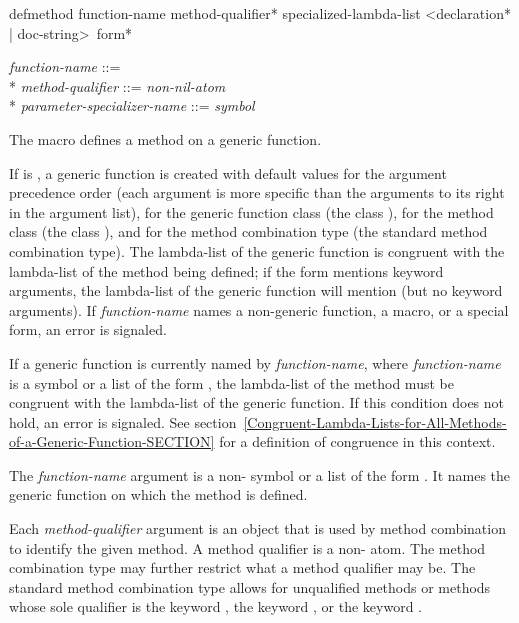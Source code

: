\begin{defmac}
defmethod function-name {method-qualifier}*
          specialized-lambda-list
          <{declaration}* | doc-string> {\,form}*

\begin{tabbing}
{\it function-name\/} ::=  \\*
{\it method-qualifier\/} ::= {\it non-nil-atom} \\*
{\it parameter-specializer-name\/} ::= {\it symbol} {\Mor} 
\end{tabbing}
The macro  defines a method on a generic function.  

If  is , a generic
function is created with default values for the argument precedence
order (each argument is more specific than the arguments to its right
in the argument list), for the generic function class (the class 
), for the method class (the class 
), and for the method combination type (the standard
method combination type).  The lambda-list of the generic function is
congruent with the lambda-list of the method being defined; if the
 form mentions keyword arguments, the lambda-list of
the generic function will mention  (but no keyword
arguments).  If {\it function-name\/} names a non-generic
function, a macro, or a special form, an error is signaled.

If a generic function is currently named by {\it
function-name\/}, where {\it function-name\/} is a symbol or
a list of the form , the lambda-list of the
method must be congruent with the lambda-list of the generic function.
If this condition does not hold, an error is signaled.  See
section~\ref{Congruent-Lambda-Lists-for-All-Methods-of-a-Generic-Function-SECTION}
for a definition of congruence in this context.




The {\it function-name\/} argument is a non- symbol or a
list of the form .  It names the generic
function on which the method is defined.

Each {\it method-qualifier\/} argument is an object that is used by
method combination to identify the given method.  A method qualifier
is a non- atom.  The method combination type may further
restrict what a method qualifier may be.  The standard method
combination type allows for unqualified methods or methods whose sole
qualifier is the keyword , the keyword 
, or the keyword .


\end{defmac}
